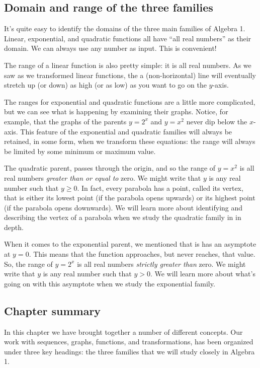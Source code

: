 \subsection{Domain and range of the three families}

It's quite easy to identify the domains of the three main families of Algebra 1. Linear, exponential, and quadratic functions all have ``all real numbers'' as their domain. We can always use any number as input. This is convenient!

The range of a linear function is also pretty simple: it is all real numbers. As we saw as we transformed linear functions, the a (non-horizontal) line will eventually stretch up (or down) as high (or as low) as you want to go on the $y$-axis.

The ranges for exponential and quadratic functions are a little more complicated, but we can see what is happening by examining their graphs. Notice, for example, that the graphs of the parents $y=2^x$ and $y=x^2$ never dip below the $x$-axis. This feature of the exponential and quadratic families will always be retained, in some form, when we transform these equations: the range will always be limited by some minimum or maximum value. 

The quadratic parent, passes through the origin, and so the range of $y=x^2$ is all real numbers \textit{greater than or equal to} zero. We might write that $y$ is any real number such that  $y\geq0$. In fact, every parabola has a point, called its \gls{vertex}, that is either its lowest point (if the parabola opens upwards) or its highest point (if the parabola opens downwards). We will learn more about identifying and describing the vertex of a parabola when we study the quadratic family in in depth.

When it comes to the exponential parent, we mentioned that is has an asymptote at $y=0$. This means that the function approaches, but never reaches, that value. So, the range of $y=2^x$ is all real numbers \textit{strictly greater than} zero. We might write that $y$ is any real number such that $y>0$. We will learn more about what's going on with this asymptote when we study the exponential family.

\subsection*{Chapter summary}

In this chapter we have brought together a number of different concepts. Our work with sequences, graphs, functions, and transformations, has been organized under three key headings: the three families that we will study closely in Algebra 1.

